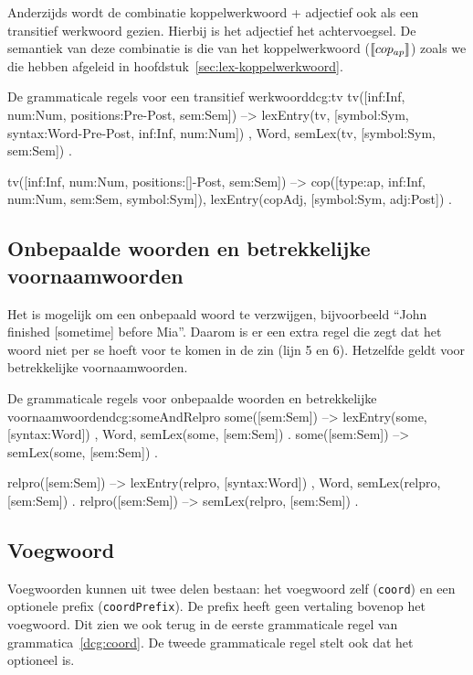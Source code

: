 Anderzijds wordt de combinatie koppelwerkwoord + adjectief ook als een transitief werkwoord gezien. Hierbij is het adjectief het achtervoegsel. De semantiek van deze combinatie is die van het koppelwerkwoord ($\llbracket cop_{ap}\rrbracket$) zoals we die hebben afgeleid in hoofdstuk~\ref{sec:lex-koppelwerkwoord}.
\begin{dcg}{De grammaticale regels voor een transitief werkwoord}{dcg:tv}
tv([inf:Inf, num:Num, positions:Pre-Post, sem:Sem]) -->
  { lexEntry(tv, [symbol:Sym, syntax:Word-Pre-Post, inf:Inf, num:Num]) },
  Word,
  { semLex(tv, [symbol:Sym, sem:Sem]) }.

tv([inf:Inf, num:Num, positions:[]-Post, sem:Sem]) -->
  cop([type:ap, inf:Inf, num:Num, sem:Sem, symbol:Sym]),
  { lexEntry(copAdj, [symbol:Sym, adj:Post]) }.
\end{dcg}

\subsection{Onbepaalde woorden en betrekkelijke voornaamwoorden}
Het is mogelijk om een onbepaald woord te verzwijgen, bijvoorbeeld ``John finished [sometime] before Mia''. Daarom is er een extra regel die zegt dat het woord niet per se hoeft voor te komen in de zin (lijn 5 en 6). Hetzelfde geldt voor betrekkelijke voornaamwoorden.

\begin{dcg}{De grammaticale regels voor onbepaalde woorden en betrekkelijke voornaamwoorden}{dcg:someAndRelpro}
some([sem:Sem]) -->
  { lexEntry(some, [syntax:Word]) },
  Word,
  { semLex(some, [sem:Sem]) }.
some([sem:Sem]) -->
  { semLex(some, [sem:Sem]) }.

relpro([sem:Sem]) -->
  { lexEntry(relpro, [syntax:Word]) },
  Word,
  { semLex(relpro, [sem:Sem]) }.
relpro([sem:Sem]) -->
  { semLex(relpro, [sem:Sem]) }.
\end{dcg}

\subsection{Voegwoord}
Voegwoorden kunnen uit twee delen bestaan: het voegwoord zelf (\texttt{coord}) en een optionele prefix (\texttt{coordPrefix}). De prefix heeft geen vertaling bovenop het voegwoord. Dit zien we ook terug in de eerste grammaticale regel van grammatica~\ref{dcg:coord}. De tweede grammaticale regel stelt ook dat het optioneel is.

